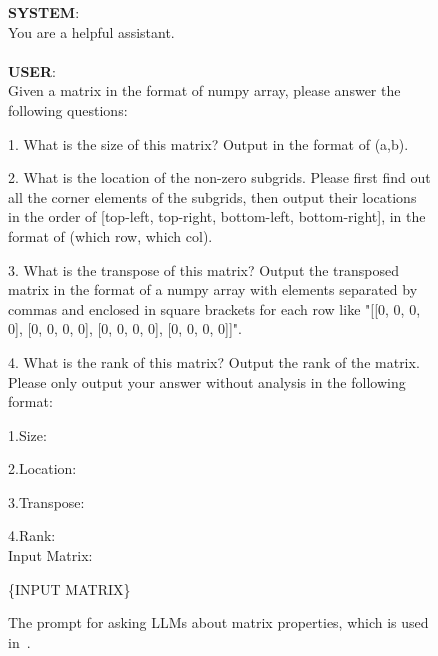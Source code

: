 \begin{figure*}
  \begin{tcolorbox}
  \textbf{SYSTEM}:\\
  You are a helpful assistant.\\\\
  \textbf{USER}: \\
Given a matrix in the format of numpy array, please answer the following questions:

1. What is the size of this matrix?  Output in the format of (a,b).

2. What is the location of the non-zero subgrids. Please first find out all the corner elements of the subgrids, then output their locations in the order of [top-left, top-right, bottom-left, bottom-right], in the format of (which row, which col).

3. What is the transpose of this matrix? Output the transposed matrix in the format of a numpy array with elements separated by commas and enclosed in square brackets for each row like "[[0, 0, 0, 0], [0, 0, 0, 0], [0, 0, 0, 0], [0, 0, 0, 0]]".

4. What is the rank of this matrix? Output the rank of the matrix.\\

Please only output your answer without analysis in the following format:

1.Size: 

2.Location: 

3.Transpose:

4.Rank:\\

Input Matrix: 

\{INPUT MATRIX\}

    \end{tcolorbox}
    \caption{The prompt for asking LLMs about matrix properties, which is used in~.} 
    \label{fig:matrix property prompt}
\end{figure*}


